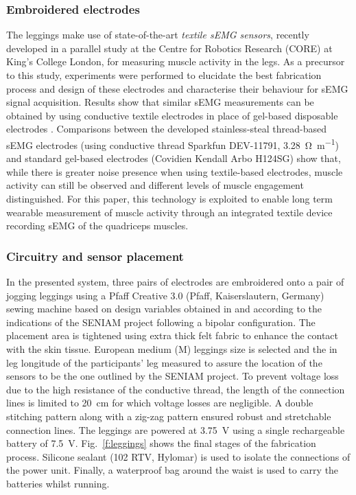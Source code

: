 \documentclass[letterpaper, 10 pt, conference]{ieeeconf}
\newcommand{\fref}[1]{Fig.~\ref{#1}}       \newcommand{\sref}[1]{\S\ref{#1}}          \newcommand{\tref}[1]{\tablename~\ref{#1}} \newcommand{\eref}[1]{(\ref{#1})}
\begin{document}
\subsubsection{Embroidered electrodes} The leggings make use of state-of-the-art
\emph{textile sEMG sensors}, recently developed in a parallel study at the Centre for Robotics Research (CORE) at King's College London, for measuring muscle activity in the legs.
As a precursor to this study, experiments were performed to elucidate the best fabrication process and design of these electrodes and characterise their behaviour for sEMG signal acquisition. Results show
that similar sEMG measurements can be obtained by using conductive textile
electrodes in place of gel-based disposable electrodes \cite{ali}. Comparisons
between the developed stainless-steal thread-based sEMG electrodes (using conductive thread Sparkfun DEV-11791,
\SI{3.28}{\ohm\per\meter}) and standard gel-based electrodes (Covidien Kendall
Arbo H124SG) show that, while there is greater noise presence when using
textile-based electrodes, muscle activity can still be observed and different
levels of muscle engagement distinguished. For this paper, this technology is
exploited to enable long term wearable measurement of  muscle activity through
an integrated textile device recording sEMG of the quadriceps muscles. 

\subsubsection{Circuitry and sensor placement}
In the presented system, three pairs of electrodes are embroidered onto a pair
of jogging leggings using a Pfaff Creative 3.0 (Pfaff, Kaiserslautern, Germany)
sewing machine based on design variables obtained in \cite{ali} and according
to the indications of the SENIAM project following a bipolar configuration. The
placement area is tightened using extra thick felt fabric to enhance the contact
with the skin tissue. European medium (M) leggings size is selected and the in leg longitude of the participants' leg measured to assure the location of the sensors to be the one outlined by the SENIAM project. 
To prevent voltage loss due to the high resistance of the conductive thread,
the length of the connection lines is limited to \SI{20}{\centi\meter} for
which voltage losses are negligible. A double stitching pattern along with a
zig-zag pattern ensured robust and stretchable connection lines. The leggings
are powered at \SI{3.75}{\volt} using a single rechargeable battery of
\SI{7.5}{\volt}. \fref{f:leggings} shows the final stages of the
fabrication process. Silicone sealant (102 RTV, Hylomar) is used to isolate
the connections of the power unit. Finally, a waterproof bag around the waist
is used to carry the batteries whilst running.
\end{document}
